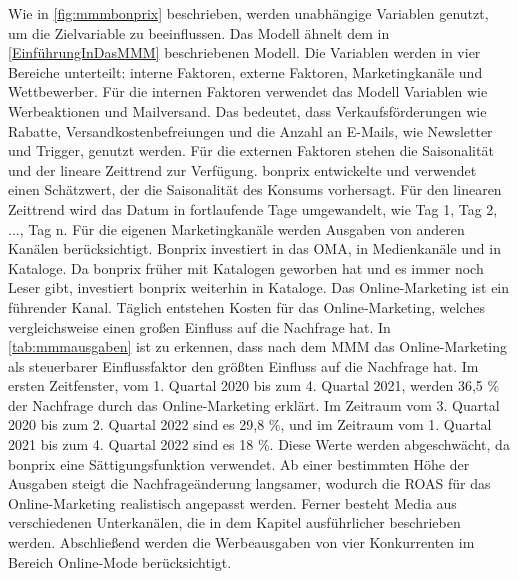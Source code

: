 Wie in \autoref{fig:mmmbonprix} beschrieben, werden unabhängige Variablen genutzt, um die Zielvariable  zu beeinflussen. Das Modell ähnelt dem in \autoref{EinführungInDasMMM} beschriebenen Modell. Die Variablen werden in vier Bereiche unterteilt: interne Faktoren, externe Faktoren, Marketingkanäle und Wettbewerber. Für die internen Faktoren verwendet das Modell Variablen wie Werbeaktionen und Mailversand. Das bedeutet, dass Verkaufsförderungen wie Rabatte, Versandkostenbefreiungen und die Anzahl an E-Mails, wie Newsletter und Trigger, genutzt werden. Für die externen Faktoren stehen die Saisonalität und der lineare Zeittrend zur Verfügung. bonprix entwickelte und verwendet einen Schätzwert, der die Saisonalität des Konsums vorhersagt. Für den linearen Zeittrend wird das Datum in fortlaufende Tage umgewandelt, wie Tag 1, Tag 2, ..., Tag n. Für die eigenen Marketingkanäle werden Ausgaben von anderen Kanälen berücksichtigt. Bonprix investiert in das \ac{OMA}, in Medienkanäle und in Kataloge. Da bonprix früher mit Katalogen geworben hat und es immer noch Leser gibt, investiert bonprix weiterhin in Kataloge. Das Online-Marketing ist ein führender Kanal. Täglich entstehen Kosten für das Online-Marketing, welches vergleichsweise einen großen Einfluss auf die Nachfrage hat. In 
\autoref{tab:mmmausgaben} ist zu erkennen, dass nach dem \ac{MMM} das Online-Marketing als steuerbarer Einflussfaktor den größten Einfluss auf die Nachfrage hat. Im ersten Zeitfenster, vom 1. Quartal 2020 bis zum 4. Quartal 2021, werden 36,5 \% der Nachfrage durch das Online-Marketing erklärt. Im Zeitraum vom 3. Quartal 2020 bis zum 2. Quartal 2022 sind es 29,8 \%, und im Zeitraum vom 1. Quartal 2021 bis zum 4. Quartal 2022 sind es 18 \%. Diese Werte werden abgeschwächt, da bonprix eine Sättigungsfunktion verwendet. Ab einer bestimmten Höhe der Ausgaben steigt die Nachfrageänderung langsamer, wodurch die ROAS für das Online-Marketing realistisch angepasst werden. Ferner besteht Media aus verschiedenen Unterkanälen, die in dem Kapitel  ausführlicher beschrieben werden. Abschließend werden die Werbeausgaben von vier Konkurrenten im Bereich Online-Mode berücksichtigt.\par
